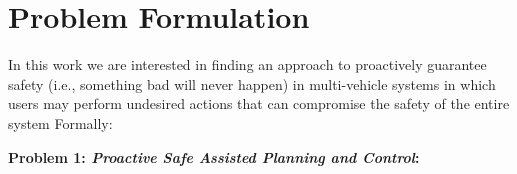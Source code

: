 \documentclass[conference]{IEEEtran}
\begin{document}
    
    
    
    
\section{Problem Formulation}
 
In this work we are interested in finding an approach to proactively guarantee safety (i.e., something bad will never happen) in multi-vehicle systems in which users may perform undesired actions that can compromise the safety of the entire system Formally: 

\textbf{Problem 1: \textit{Proactive Safe Assisted Planning and Control}:} 
    
\end{document}
